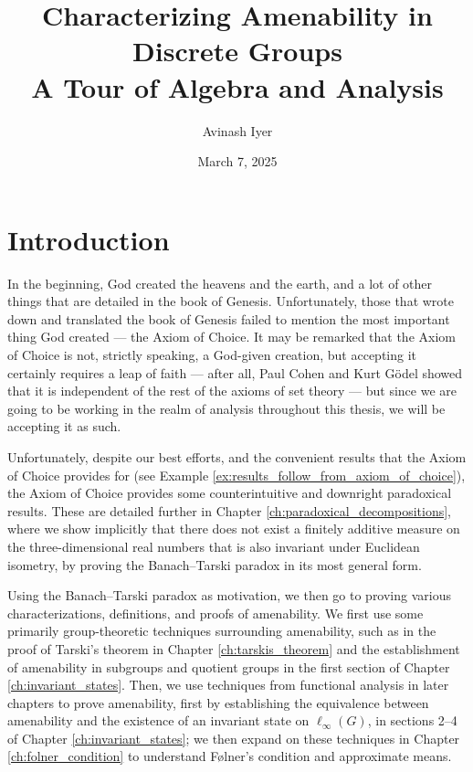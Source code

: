 \documentclass[10pt]{package2}
\title{Characterizing Amenability in Discrete Groups\\{\large A Tour of Algebra and Analysis}}
\author{Avinash Iyer}
\date{March 7, 2025}
\begin{document}
\maketitle
\RaggedRight
\tableofcontents
\chapter{Introduction}
In the beginning, God created the heavens and the earth, and a lot of other things that are detailed in the book of Genesis. Unfortunately, those that wrote down and translated the book of Genesis failed to mention the most important thing God created --- the Axiom of Choice. It may be remarked that the Axiom of Choice is not, strictly speaking, a God-given creation, but accepting it certainly requires a leap of faith --- after all, Paul Cohen and Kurt Gödel showed that it is independent of the rest of the axioms of set theory --- but since we are going to be working in the realm of analysis throughout this thesis, we will be accepting it as such.\newline

Unfortunately, despite our best efforts, and the convenient results that the Axiom of Choice provides for (see Example \ref{ex:results_follow_from_axiom_of_choice}), the Axiom of Choice provides some counterintuitive and downright paradoxical results. These are detailed further in Chapter \ref{ch:paradoxical_decompositions}, where we show implicitly that there does not exist a finitely additive measure on the three-dimensional real numbers that is also invariant under Euclidean isometry, by proving the Banach--Tarski paradox in its most general form.\newline

Using the Banach--Tarski paradox as motivation, we then go to proving various characterizations, definitions, and proofs of amenability. We first use some primarily group-theoretic techniques surrounding amenability, such as in the proof of Tarski's theorem in Chapter \ref{ch:tarskis_theorem} and the establishment of amenability in subgroups and quotient groups in the first section of Chapter \ref{ch:invariant_states}. Then, we use techniques from functional analysis in later chapters to prove amenability, first by establishing the equivalence between amenability and the existence of an invariant state on $\ell_{\infty}(G)$, in sections 2--4 of Chapter \ref{ch:invariant_states}; we then expand on these techniques in Chapter \ref{ch:folner_condition} to understand Følner's condition and approximate means.\newline
\end{document}
